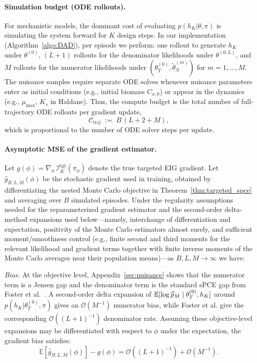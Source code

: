 \paragraph{Simulation budget (ODE rollouts).}
For mechanistic models, the dominant cost of evaluating $p(h_K|\theta,\pi)$ is simulating the system forward for $K$ design steps.
In our implementation (Algorithm~\ref{algo:DAD}), per episode we perform:
one rollout to generate $h_K$ under $\theta^{(0)}$,
$(L+1)$ rollouts for the denominator likelihoods under $\theta^{(0:L)}$, and
$M$ rollouts for the numerator likelihoods under $(\theta_T^{(0)}, \tilde{\theta}_N^{(m)})$ for $m=1,\ldots,M$.
The nuisance samples require separate ODE solves whenever nuisance parameters enter as initial conditions (e.g., initial biomass $C_{x,0}$) or appear in the dynamics (e.g., $\mu_{\max}$, $K_s$ in Haldane).
Thus, the compute budget is the total number of full-trajectory ODE rollouts per gradient update,
\begin{equation}
\label{eq:budget_rollouts}
\mathcal{C}_{\text{traj}} \;:=\; B\,(L+2+M),
\end{equation}
which is proportional to the number of ODE solver steps per update.

\paragraph{Asymptotic MSE of the gradient estimator.}
Let $g(\phi)=\nabla_\phi\,\mathcal{I}_K^{\text{tgt}}(\pi_\phi)$ denote the true targeted EIG gradient.
Let $\hat g_{B,L,M}(\phi)$ be the stochastic gradient used in training, obtained by differentiating the nested Monte Carlo objective in Theorem~\ref{thm:targeted_spce} and averaging over $B$ simulated episodes.
Under the regularity assumptions needed for the reparameterized gradient estimator and the second-order delta-method expansions used below---namely, interchange of differentiation and expectation, positivity of the Monte Carlo estimators almost surely, and sufficient moment/smoothness control (e.g., finite second and third moments for the relevant likelihood and gradient terms together with finite inverse moments of the Monte Carlo averages near their population means)---as $B,L,M\to\infty$ we have:

\emph{Bias.} At the objective level, Appendix~\ref{sec:nuisance} shows that the numerator term is a Jensen gap and the denominator term is the standard sPCE gap from Foster et al.~\cite{foster2021}. A second-order delta expansion of $\operatorname{\mathbb{E}}[\log \widehat p_M\mid \theta_T^{(0)},h_K]$ around $p(h_K|\theta_T^{(0)},\pi)$ gives an $\mathcal{O}(M^{-1})$ numerator bias, while Foster et al. give the corresponding $\mathcal{O}((L+1)^{-1})$ denominator rate. Assuming these objective-level expansions may be differentiated with respect to $\phi$ under the expectation, the gradient bias satisfies:
\begin{equation}
\mathbb{E}[\hat g_{B,L,M}(\phi)] - g(\phi) = \mathcal{O}((L+1)^{-1}) + \mathcal{O}(M^{-1}).
\end{equation}

